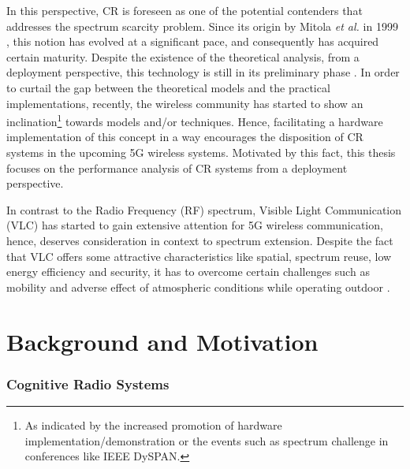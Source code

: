 In this perspective, CR is foreseen as one of the potential contenders that addresses the spectrum scarcity problem. Since its origin by Mitola \textit{et al.} in 1999 \cite{Mitola99}, this notion has evolved at a significant pace, and consequently has acquired certain maturity. Despite the existence of the theoretical analysis, from a deployment perspective, this technology is still in its preliminary phase \cite{Pawe11}. In order to curtail the gap between the theoretical models and the practical implementations, recently, the wireless community has started to show an inclination\footnote{As indicated by the increased promotion of hardware implementation/demonstration or the events such as spectrum challenge in conferences like IEEE DySPAN.} towards models and/or techniques. Hence, facilitating a hardware implementation of this concept in a way encourages the disposition of CR systems in the upcoming 5G wireless systems. Motivated by this fact, this thesis focuses on the performance analysis of CR systems from a deployment perspective. 

In contrast to the Radio Frequency (RF) spectrum, Visible Light Communication (VLC)  has started to gain extensive attention for 5G wireless communication, hence, deserves consideration in context to spectrum extension. Despite the fact that VLC offers some attractive characteristics like spatial, spectrum reuse, low energy efficiency and security, it has to overcome certain challenges such as mobility and adverse effect of atmospheric conditions while operating outdoor \cite{Wu14}. 


\section{Background and Motivation}
\label{sec:mot}

\subsubsection*{Cognitive Radio Systems }


